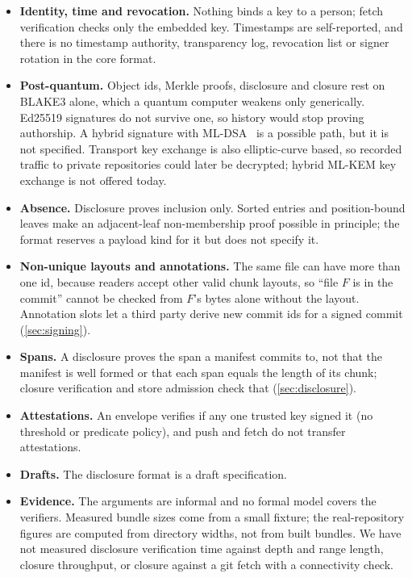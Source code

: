 \documentclass[10pt,letterpaper]{article}
\theoremstyle{remark}
\begin{document}
\begin{itemize}
  \item \textbf{Identity, time and revocation.} Nothing binds a key to a
        person; fetch verification checks only the embedded key. Timestamps
        are self-reported, and there is no timestamp authority, transparency
        log, revocation list or signer rotation in the core format.
  \item \textbf{Post-quantum.} Object ids, Merkle proofs, disclosure and
        closure rest on BLAKE3 alone, which a quantum computer weakens only
        generically. Ed25519 signatures do not survive one, so history would
        stop proving authorship. A hybrid signature with
        ML-DSA~\cite{fips204} is a possible path, but it is not specified.
        Transport key exchange is also elliptic-curve based, so recorded
        traffic to private repositories could later be decrypted; hybrid
        ML-KEM key exchange is not offered today.
  \item \textbf{Absence.} Disclosure proves inclusion only. Sorted entries and
        position-bound leaves make an adjacent-leaf non-membership proof
        possible in principle; the format reserves a payload kind for it but
        does not specify it.
  \item \textbf{Non-unique layouts and annotations.} The same file can have
        more than one id, because readers accept other valid chunk layouts, so
        ``file $F$ is in the commit'' cannot be checked from $F$'s bytes alone
        without the layout. Annotation slots let a third party derive new
        commit ids for a signed commit (\cref{sec:signing}).
  \item \textbf{Spans.} A disclosure proves the span a manifest commits to,
        not that the manifest is well formed or that each span equals the
        length of its chunk; closure verification and store admission check
        that (\cref{sec:disclosure}).
  \item \textbf{Attestations.} An envelope verifies if any one trusted key
        signed it (no threshold or predicate policy), and push and fetch do
        not transfer attestations.
  \item \textbf{Drafts.} The disclosure format is a draft specification.
  \item \textbf{Evidence.} The arguments are informal and no formal model
        covers the verifiers. Measured bundle sizes come from a small fixture;
        the real-repository figures are computed from directory widths, not
        from built bundles. We have not measured disclosure verification time
        against depth and range length, closure throughput, or closure against
        a git fetch with a connectivity check.
\end{itemize}
\end{document}
